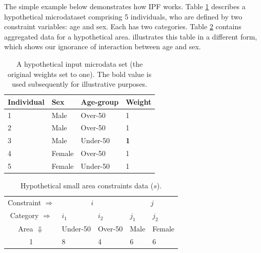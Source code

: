 \documentclass[a4paper, 11pt, twoside]{article}
\begin{document}
%
%
%
%
%
%
%

The simple example below demonstrates how IPF works.
Table \ref{t:w}  describes a
hypothetical microdataset comprising 5 individuals, who are defined by two
constraint variables: age and sex. Each has two categories.
Table \ref{t:s} contains aggregated data
for a hypothetical area.  illustrates this table in a different form,
which shows our ignorance of interaction between age and sex.


\begin{table}[h]
\centering
\caption[A hypothetical input microdata set]{A
hypothetical input microdata set (the original
weights set to one). The bold value is used subsequently for
illustrative purposes.}
\begin{tabular}{llll}
\toprule
{Individual } & {Sex} & {Age-group} & {Weight} \\
\midrule
1 & Male & Over-50 & 1 \\
2 & Male & Over-50 & 1 \\
3 & {Male} & {Under-50} & \textbf{1} \\
4 & Female & Over-50 & 1 \\
5 & Female & Under-50 & 1 \\
\bottomrule
\end{tabular}
\label{t:w}
\end{table}
\vspace{1cm}


\begin{table}[htbp]
\centering
\caption{Hypothetical small area constraints data ($s$).}
\begin{tabular}{cllll}
\toprule
Constraint $\Rightarrow$ & \multicolumn{2}{c}{$i$}& \multicolumn{2}{c}{$j$}\\
Category $\Rightarrow$ & $i_1$ & $i_2$ & $j_1$ & $j_2$ \\
Area $\Downarrow$  & Under-50 & Over-50 &  Male & Female\\
1  & 8 & 4 & 6 & 6\\
\bottomrule
\end{tabular}
\label{t:s}
\end{table}
\vspace{1cm}
\end{document}

